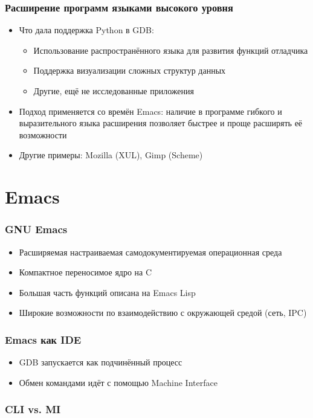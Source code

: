 \documentclass[onlymath]{beamer}
\begin{document}
\begin{frame}
  \frametitle{Расширение программ языками высокого уровня}
  \begin{itemize}
  \item Что дала поддержка Python в GDB:
    \begin{itemize}
    \item Использование распространённого языка для развития функций
      отладчика
    \item Поддержка визуализации сложных структур данных
    \item Другие, ещё не исследованные приложения
    \end{itemize}
  \item Подход применяется со времён Emacs: наличие в программе
    гибкого и выразительного языка расширения позволяет быстрее и
    проще расширять её возможности
  \item Другие примеры: Mozilla (XUL), Gimp (Scheme)
  \end{itemize}
\end{frame}

\section{Emacs}
\begin{frame}
  \frametitle{GNU Emacs}

  \begin{itemize}
  \item Расширяемая настраиваемая самодокументируемая операционная
    среда
  \item Компактное переносимое ядро на C
  \item Большая часть функций описана на Emacs Lisp
  \item Широкие возможности по взаимодействию с окружающей средой
    (сеть, IPC)
  \end{itemize}
\end{frame}

\begin{frame}
  \frametitle{Emacs как IDE}

  \begin{itemize}
  \item GDB запускается как подчинённый процесс
  \item Обмен командами идёт с помощью Machine Interface
  \end{itemize}
\end{frame}

\begin{frame}
  \frametitle{CLI vs. MI}
  
\end{frame}
\end{document}

